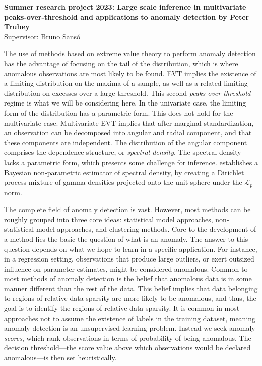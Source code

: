 \documentclass{article}
\begin{document}
{\Large \bf Summer research project 2023: Large scale inference in multivariate peaks-over-threshold 
and applications to anomaly detection by Peter Trubey}\\
\vskip 0.15cm
Supervisor: Bruno Sans\'{o}
\vskip 1cm
\nobibliography*

The use of methods based on extreme value theory to perform anomaly detection
    has the advantage of focusing on the tail of the distribution, which is where
    anomalous observations are most likely to be found.  EVT implies
    the existence of a limiting distribution on the maxima of a sample, as well
    as a related limiting distribution on excesses over a large threshold.  This
    second \emph{peaks-over-threshold} regime is what we will be considering here.
    In the univariate case, the limiting form of the distribution has a 
    parametric form.  This does not hold for the multivariate case.  Multivariate
    EVT implies that after marginal standardization, an observation can be decomposed
    into angular and radial component, and that these components are independent.
    The distribution of the angular component comprises the dependence structure, or
    \emph{spectral density}.  The spectral density lacks a parametric form, which
    presents some challenge for inference. \cite{trubey:pg} establishes a Bayesian
    non-parametric estimator of spectral density, by creating a Dirichlet process mixture
    of gamma densities projected onto the unit sphere under the $\mathcal{L}_p$ norm.

The complete field of anomaly detection is vast.  However, most methods can be 
    roughly grouped into three core ideas: statistical model approaches, 
    non-statistical model approaches, and clustering methods. Core to the 
    development of a method lies the basic the question of what is an anomaly.  
    The answer to this question depends on what we hope to
    learn in a specific application.  For instance, in a regression setting, 
    observations that produce large outliers, or exert outsized influence on parameter 
    estimates, might be considered anomalous.  Common to most 
    methods of anomaly detection is the belief that anomalous data is in some 
    manner different than the rest of the data. This belief implies that data 
    belonging to regions of relative data sparsity are more likely to be 
    anomalous, and thus, the goal is to identify the regions of relative 
    data sparsity. It is common in most approaches not to assume the existence of 
    labels in the training dataset, meaning anomaly detection is an unsupervised learning
    problem.  Instead we seek anomaly \emph{scores}, which rank observations in terms of
    probability of being anomalous.  The decision threshold---the score value above which
    observations would be declared anomalous---is then set heuristically.
    
\end{document}
